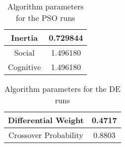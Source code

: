 \begin{table}
	\centering
	\begin{tabular}{ | c | c | }
		\hline
		Inertia & 0.729844 \\ \hline
		Social & 1.496180 \\ \hline
		Cognitive & 1.496180 \\ \hline
	\end{tabular}
	\caption{Algorithm parameters for the PSO runs}
	\label{table:ea-pso-algo}
\end{table}

\begin{table}
	\centering
	\begin{tabular}{ | c | c | }
		\hline
		Differential Weight & 0.4717 \\ \hline
		Crossover Probability & 0.8803 \\ \hline
	\end{tabular}
	\caption{Algorithm parameters for the DE runs}
	\label{table:ea-de-algo}
\end{table}